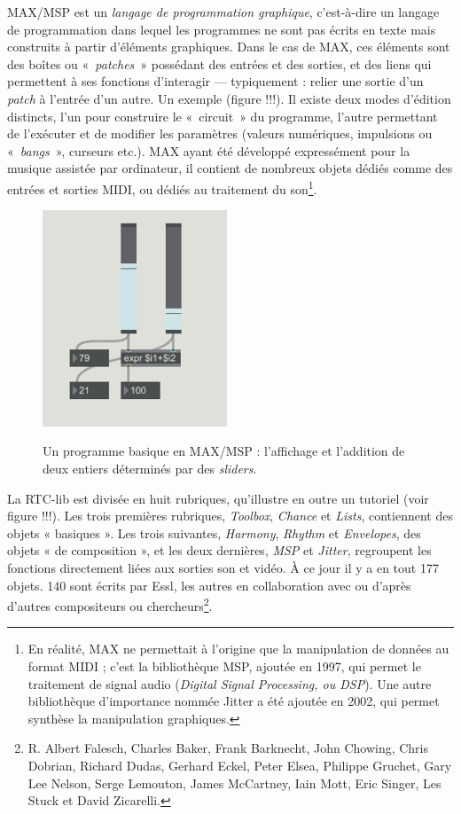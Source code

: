 \documentclass[a4paper,12pt]{article}
\newcommand{\guill}[1]{«~#1~»}
\begin{document}
MAX/MSP est un \emph{langage de programmation graphique}, c'est-à-dire un langage de programmation dans lequel les programmes ne sont pas écrits en texte mais construits à partir d'éléments graphiques. Dans le cas de MAX, ces éléments sont des boîtes ou \guill{\emph{patches}} possédant des entrées et des sorties, et des liens qui permettent à ses fonctions d'interagir --- typiquement : relier une sortie d'un \emph{patch} à l'entrée d'un autre. Un exemple (figure !!!). Il existe deux modes d'édition distincts, l'un pour construire le \guill{circuit} du programme, l'autre permettant de l'exécuter et de modifier les paramètres (valeurs numériques, impulsions ou \guill{\emph{bangs}}, curseurs etc.). MAX ayant été développé expressément pour la musique assistée par ordinateur, il contient de nombreux objets dédiés comme des entrées et sorties MIDI, ou dédiés au traitement du son\footnote{En réalité, MAX ne permettait à l'origine que la manipulation de données au format MIDI ; c'est la bibliothèque MSP, ajoutée en 1997, qui permet le traitement de signal audio (\emph{Digital Signal Processing, ou DSP}). Une autre bibliothèque d'importance nommée Jitter a été ajoutée en 2002, qui permet synthèse la manipulation graphiques.}.

\begin{figure}[h!]
\centering
\includegraphics[width=5.5cm]{images/MAXbase.png}
\label{maxmsp}
\caption{Un programme basique en MAX/MSP : l'affichage et l'addition de deux entiers déterminés par des \emph{sliders}.}
\end{figure}


La RTC-lib est divisée en huit rubriques, qu'illustre en outre un tutoriel (voir figure !!!). Les trois premières rubriques, \emph{Toolbox}, \emph{Chance} et \emph{Lists}, contiennent des objets « basiques ». Les trois suivantes, \emph{Harmony}, \emph{Rhythm} et \emph{Envelopes}, des objets « de composition », et les deux dernières, \emph{MSP} et \emph{Jitter}, regroupent les fonctions directement liées aux sorties son et vidéo. À ce jour il y a en tout 177 objets. 140 sont écrits par Essl, les autres en collaboration avec ou d'après d'autres compositeurs ou chercheurs\footnote{R. Albert Falesch, Charles Baker, Frank Barknecht, John Chowing, Chris Dobrian, Richard Dudas, Gerhard Eckel, Peter Elsea, Philippe Gruchet, Gary Lee Nelson, Serge Lemouton, James McCartney, Iain Mott, Eric Singer, Les Stuck et David Zicarelli.}.
\end{document}
